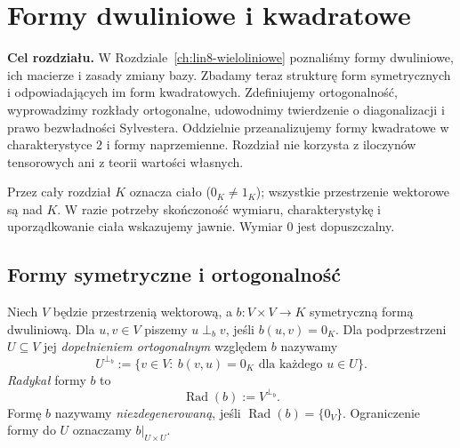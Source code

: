 \chapter{Formy dwuliniowe i kwadratowe}
\label{ch:lin9-formy-kwadratowe}

\noindent\textbf{Cel rozdziału.}
W Rozdziale~\ref{ch:lin8-wieloliniowe}
poznaliśmy formy dwuliniowe, ich macierze
i zasady zmiany bazy. Zbadamy teraz strukturę
form symetrycznych i odpowiadających im
form kwadratowych. Zdefiniujemy ortogonalność,
wyprowadzimy rozkłady ortogonalne,
udowodnimy twierdzenie o diagonalizacji
i prawo bezwładności Sylvestera.
Oddzielnie przeanalizujemy formy kwadratowe
w charakterystyce \(2\) i formy naprzemienne.
Rozdział nie korzysta z iloczynów tensorowych
ani z teorii wartości własnych.

Przez cały rozdział \(K\) oznacza ciało
(\(0_K\ne1_K\)); wszystkie przestrzenie
wektorowe są nad \(K\). W razie
potrzeby skończoność wymiaru,
charakterystykę i uporządkowanie
ciała wskazujemy jawnie.
Wymiar \(0\) jest dopuszczalny.

\section{Formy symetryczne i ortogonalność}
\label{sec:lin9-ortogonalnosc}

\begin{definicja}
\label{def:lin9-ortogonalnosc}
Niech \(V\) będzie przestrzenią
wektorową, a
\(b\colon V\times V\to K\)
symetryczną formą dwuliniową.
Dla \(u,v\in V\) piszemy
\(u\perp_b v\), jeśli \(b(u,v)=0_K\).
Dla podprzestrzeni \(U\subseteq V\)
jej \emph{dopełnieniem ortogonalnym}
względem \(b\) nazywamy
\[
 U^{\perp_b}
 :=\{v\in V:\ b(v,u)=0_K
                   \text{ dla każdego }u\in U\}.
\]
\emph{Radykał} formy \(b\) to
\[
 \operatorname{Rad}(b):=V^{\perp_b}.
\]
Formę \(b\) nazywamy
\emph{niezdegenerowaną},
jeśli \(\operatorname{Rad}(b)=\{0_V\}\).
Ograniczenie formy do \(U\)
oznaczamy \(b|_{U\times U}\).
\end{definicja}

